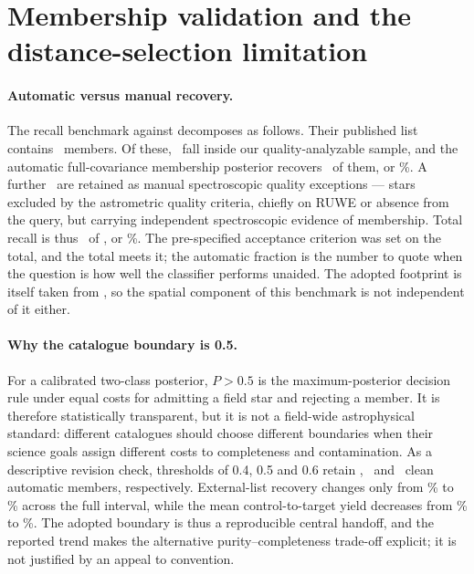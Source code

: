 \documentclass{aa}
\begin{document}

\clearpage

\section{Membership validation and the distance-selection
limitation}\label{app:membership}

\paragraph{Automatic versus manual recovery.}
The recall benchmark against \citet{berlanas2019} decomposes as follows. Their
published list contains \recallPublished\ members. Of these, \recallAnalyzable\
fall inside our quality-analyzable sample, and the automatic full-covariance
membership posterior recovers \recallAuto\ of them, or \recallAutoPct\%. A
further \recallManual\ are retained as manual spectroscopic quality exceptions
--- stars excluded by the astrometric quality criteria, chiefly on RUWE or
absence from the query, but carrying independent spectroscopic evidence of
membership. Total recall is thus \recallTotal\ of \recallPublished, or
\recallTotalPct\%. The pre-specified acceptance criterion was set on the total,
and the total meets it; the
automatic fraction is the number to quote when the question is how well the
classifier performs unaided. The adopted footprint is itself taken from
\citet{berlanas2019}, so the spatial component of this benchmark is not
independent of it either.

\paragraph{Why the catalogue boundary is 0.5.}
For a calibrated two-class posterior, $P>0.5$ is the maximum-posterior decision
rule under equal costs for admitting a field star and rejecting a member. It is
therefore statistically transparent, but it is not a field-wide astrophysical
standard: different catalogues should choose different boundaries when their
science goals assign different costs to completeness and contamination. As a
descriptive revision check, thresholds of 0.4, 0.5 and 0.6 retain
\thresholdMembersLow, \thresholdMembersAdopted\ and \thresholdMembersHigh\ clean
automatic members, respectively. External-list recovery changes only from
\thresholdRecallLow\% to \thresholdRecallHigh\% across the full interval, while
the mean control-to-target yield decreases from \thresholdControlLow\% to
\thresholdControlHigh\%. The adopted boundary is thus a reproducible central
handoff, and the reported trend makes the alternative purity--completeness
trade-off explicit; it is not justified by an appeal to convention.
\end{document}
